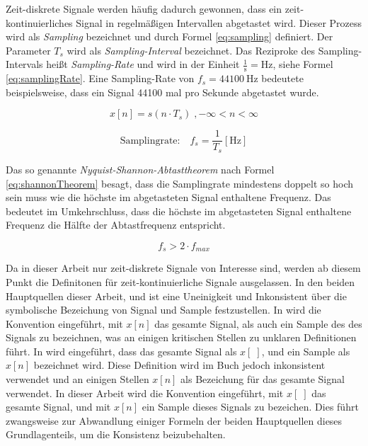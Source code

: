 Zeit-diskrete Signale werden häufig dadurch gewonnen, dass ein zeit-kontinuierliches Signal in regelmäßigen Intervallen abgetastet wird. Dieser Prozess wird als \emph{Sampling} bezeichnet und durch Formel \ref{eq:sampling} definiert. Der Parameter $T_s$ wird als \emph{Sampling-Interval} bezeichnet. Das Reziproke des Sampling-Intervals heißt \emph{Sampling-Rate} und wird in der Einheit $\frac{1}{\text{s}} = \text{Hz}$, siehe Formel \ref{eq:samplingRate}. Eine Sampling-Rate von $f_s = \SI{44100}{\hertz}$ bedeutete beispielsweise, dass ein Signal 44100 mal pro Sekunde abgetastet wurde.\cite[S. 24]{dspMichigan}

\begin{equation}
x[n] = s(n \cdot T_s) \; , -\infty < n < \infty
\label{eq:sampling}
\end{equation}
	
\begin{equation}
	\text{Samplingrate:} \quad f_s = \frac{1}{T_s} [\text{Hz}]
	\label{eq:samplingRate}
\end{equation}	

Das so genannte \emph{Nyquist-Shannon-Abtasttheorem} nach Formel \ref{eq:shannonTheorem} besagt, dass die Samplingrate mindestens doppelt so hoch sein muss wie die höchste im abgetasteten Signal enthaltene Frequenz. Das bedeutet im Umkehrschluss, dass die höchste im abgetasteten Signal enthaltene Frequenz die Hälfte der Abtastfrequenz entspricht.

\begin{equation}
f_s > 2 \cdot f_{max}
\label{eq:shannonTheorem}
\end{equation}	
	
Da in dieser Arbeit nur zeit-diskrete Signale von Interesse sind, werden ab diesem Punkt die Definitonen für zeit-kontinuierliche Signale ausgelassen. In den beiden Hauptquellen dieser Arbeit, \cite{dspGuide} und \cite{dspMichigan} ist eine Uneinigkeit und Inkonsistent über die symbolische Bezeichung von Signal und Sample festzustellen.  In \cite{dspMichigan} wird die Konvention eingeführt, mit $x[n]$ das gesamte Signal, als auch ein Sample des des Signals zu bezeichnen, was an einigen kritischen Stellen zu unklaren Definitionen führt. In \cite{dspGuide} wird eingeführt, dass das gesamte Signal als $x[\;]$, und ein Sample als $x[n]$ bezeichnet wird. Diese Definition wird im Buch jedoch inkonsistent verwendet und an einigen Stellen $x[n]$ als Bezeichung für das gesamte Signal verwendet.  In dieser Arbeit wird die Konvention eingeführt, mit $x[\;]$ das gesamte Signal, und mit $x[n]$ ein Sample dieses Signals zu bezeichen. Dies führt zwangsweise zur Abwandlung einiger Formeln der beiden Hauptquellen dieses Grundlagenteils, um die Konsistenz beizubehalten.

